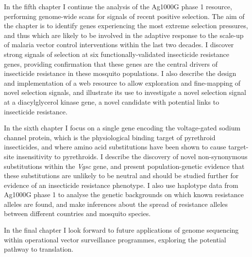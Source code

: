 \begin{refsection}
In the fifth chapter I continue the analysis of the Ag1000G phase 1 resource, performing genome-wide scans for signals of recent positive selection.
%
The aim of the chapter is to identify genes experiencing the most extreme selection pressures, and thus which are likely to be involved in the adaptive response to the scale-up of malaria vector control interventions within the last two decades.
%
I discover strong signals of selection at six functionally-validated insecticide resistance genes, providing confirmation that these genes are the central drivers of insecticide resistance in these mosquito populations.
%
I also describe the design and implementation of a web resource to allow exploration and fine-mapping of novel selection signals, and illustrate its use to investigate a novel selection signal at a diacylglycerol kinase gene, a novel candidate with potential links to insecticide resistance.


In the sixth chapter I focus on a single gene encoding the voltage-gated sodium channel protein, which is the physiological binding target of pyrethroid insecticides, and where amino acid substitutions have been shown to cause target-site insensitivity to pyrethroids.
%
I describe the discovery of novel non-synonymous substitutions within the \textit{Vgsc} gene, and present population-genetic evidence that these substitutions are unlikely to be neutral and should be studied further for evidence of an insecticide resistance phenotype.
%
I also use haplotype data from Ag1000G phase 1 to analyse the genetic backgrounds on which known resistance alleles are found, and make inferences about the spread of resistance alleles between different countries and mosquito species.


In the final chapter I look forward to future applications of genome sequencing within operational vector surveillance programmes, exploring the potential pathway to translation. 


\printbibliography[
heading=subbibintoc,
title={References}
]

\end{refsection}
